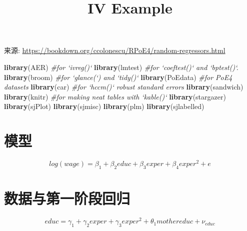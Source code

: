 \documentclass[
]{article}
\title{IV Example}
\author{}
\date{\vspace{-2.5em}}
\newenvironment{Shaded}{\begin{snugshade}}{\end{snugshade}}
\newcommand{\CommentTok}[1]{\textcolor[rgb]{0.56,0.35,0.01}{\textit{#1}}}
\newcommand{\KeywordTok}[1]{\textcolor[rgb]{0.13,0.29,0.53}{\textbf{#1}}}
\newcommand{\NormalTok}[1]{#1}
\begin{document}
\maketitle

来源: \url{https://bookdown.org/ccolonescu/RPoE4/random-regressors.html}

\begin{Shaded}
\begin{Highlighting}[]
\KeywordTok{library}\NormalTok{(AER) }\CommentTok{#for `ivreg()`}
\KeywordTok{library}\NormalTok{(lmtest) }\CommentTok{#for `coeftest()` and `bptest()`.}
\KeywordTok{library}\NormalTok{(broom) }\CommentTok{#for `glance(`) and `tidy()`}
\KeywordTok{library}\NormalTok{(PoEdata) }\CommentTok{#for PoE4 datasets}
\KeywordTok{library}\NormalTok{(car) }\CommentTok{#for `hccm()` robust standard errors}
\KeywordTok{library}\NormalTok{(sandwich)}
\KeywordTok{library}\NormalTok{(knitr) }\CommentTok{#for making neat tables with `kable()`}
\KeywordTok{library}\NormalTok{(stargazer) }
\KeywordTok{library}\NormalTok{(sjPlot)}
\KeywordTok{library}\NormalTok{(sjmisc)}
\KeywordTok{library}\NormalTok{(plm)}
\KeywordTok{library}\NormalTok{(sjlabelled)}
\end{Highlighting}
\end{Shaded}

\hypertarget{ux6a21ux578b}{%
\section{模型}\label{ux6a21ux578b}}

\[\begin{equation}
log(wage)=\beta_{1}+\beta_{2}educ+\beta_{3}exper+\beta_{4}exper^2+e
\label{eq:wagelm10}
\end{equation}\]

\hypertarget{ux6570ux636eux4e0eux7b2cux4e00ux9636ux6bb5ux56deux5f52}{%
\section{数据与第一阶段回归}\label{ux6570ux636eux4e0eux7b2cux4e00ux9636ux6bb5ux56deux5f52}}

\[\begin{equation}
educ=\gamma_{1}+\gamma_{2}exper+\gamma_{3}exper^2+\theta_{1}mothereduc+\nu_{educ}
\label{eq:firstStageEduc10}
\end{equation}\]
\end{document}
